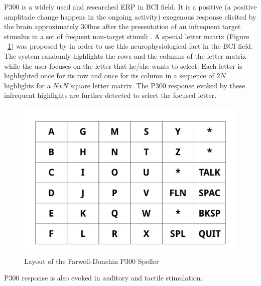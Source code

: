 \documentclass[12pt]{article}
\numberwithin{equation}{section}
\numberwithin{figure}{section}
\numberwithin{table}{section}
\begin{document}
\par{
    P300 is a widely used and researched ERP in BCI field. It is a positive (a positive
    amplitude change happens in the ongoing activity) exogenous response elicited by the brain approximately
    300ms after the presentation of an infrequent target stimulus in a set of frequent
    non-target stimuli \citep{polich_updating_2007}.
    A special letter matrix (Figure ~\ref{fig:p300_speller}) was proposed by \citet{farwell_talking_1988} in order to use
    this neurophysiological fact in the BCI field. The system randomly highlights the rows and
    the columns of the letter matrix while the user focuses on the letter that he/she
    wants to select. Each letter is highlighted once for its row and once for its column
    in a sequence of $2N$ highlights for a $NxN$ square letter matrix. The P300 response
    evoked by these infrequent highlights are further detected to select the focused letter.
    \begin{figure}[ht]
        \centering
        \includegraphics[scale=0.5]{images/p300_speller}
        \caption{Layout of the Farwell-Donchin P300 Speller}
        \label{fig:p300_speller}
    \end{figure}
}
\par{
    P300 response is also evoked in auditory and tactile stimulation.
}
\end{document}

